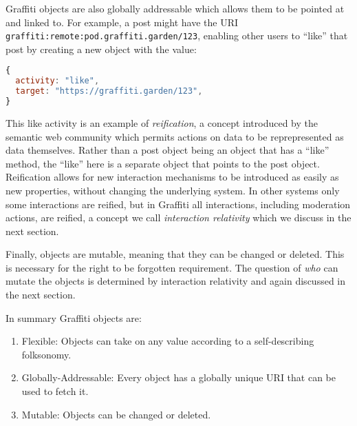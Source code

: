 Graffiti objects are also globally addressable which allows them to be
pointed at and linked to.
For example, a post might have the URI \texttt{graffiti:remote:pod.graffiti.garden/123},
enabling other users to ``like'' that post by creating a new object with the value:

\begin{lstlisting}[language=javascript]
{
  activity: "like",
  target: "https://graffiti.garden/123",
}
\end{lstlisting}

This like activity is an example of \emph{reification},
a concept introduced by the semantic web community
which permits actions on data to be reprepresented as data themselves.
Rather than a post object being an object that has a ``like'' method,
the ``like'' here is a separate object that points to the post object.
Reification allows for new interaction mechanisms to be introduced as easily as new properties,
without changing the underlying system. In other systems only some interactions are reified,
but in Graffiti all interactions, including moderation actions, are reified,
a concept we call \emph{interaction relativity} which we discuss in the next section.


Finally, objects are mutable, meaning that they can be changed or deleted.
This is necessary for the right to be forgotten requirement.
The question of \emph{who} can mutate the objects is determined
by interaction relativity and again discussed in the next section.

In summary Graffiti objects are:

\begin{enumerate}
\item
Flexible: Objects can take on any value according to a self-describing folksonomy.
\item
Globally-Addressable: Every object has a globally unique URI that can be used to fetch it.
\item
Mutable: Objects can be changed or deleted.
\end{enumerate}

